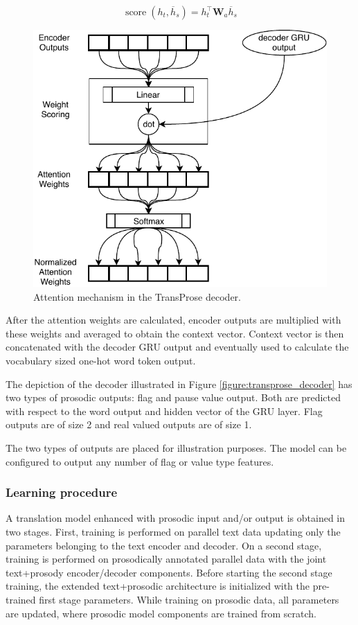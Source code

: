 \begin{equation}
\label{equation:attn2}
\operatorname { score } \left( h _ { t } , \overline { h } _ { s } \right) = h _ { t } ^ { \top } \mathbf { W } _ { a } \overline { h } _ { s }
\end{equation}

\begin{figure}
\centering
\includegraphics[width=0.7\linewidth]{img/TransProse_attn.pdf}
\caption{Attention mechanism in the TransProse decoder.}
\label{figure:transprose_attn}
\end{figure}

After the attention weights are calculated, encoder outputs are multiplied with these weights and averaged to obtain the context vector. Context vector is then concatenated with the decoder GRU output and eventually used to calculate the vocabulary sized one-hot word token output. 

The depiction of the decoder illustrated in Figure \ref{figure:transprose_decoder} has two types of prosodic outputs: flag and pause value output. Both are predicted with respect to the word output and hidden vector of the GRU layer. Flag outputs are of size 2 and real valued outputs are of size 1. 

The two types of outputs are placed for illustration purposes. The model can be configured to output any number of flag or value type features. 

\subsubsection{Learning procedure}
A translation model enhanced with prosodic input and/or output is obtained in two stages. First, training is performed on parallel text data updating only the parameters belonging to the text encoder and decoder. On a second stage, training is performed on prosodically annotated parallel data with the joint text+prosody encoder/decoder components. Before starting the second stage training, the extended text+prosodic architecture is initialized with the pre-trained first stage parameters. While training on prosodic data, all parameters are updated, where prosodic model components are trained from scratch. 


